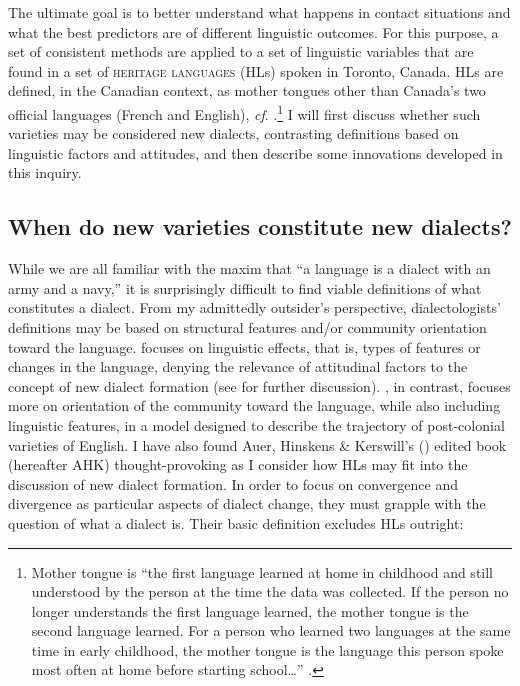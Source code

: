 \documentclass[output=paper]{LSP/langsci}
\begin{document}
The ultimate goal is to better understand what happens in contact situations and what the best predictors are of different linguistic outcomes. For this purpose, a set of consistent methods are applied to a set of linguistic variables that are found in a set of \textsc{heritage languages} (HLs) spoken in Toronto, Canada. HLs are defined, in the Canadian context, as mother tongues other than Canada’s two official languages (French and English), \textit{cf}. \citet{cummins_lifting_1990}.\footnote{Mother tongue is “the first language learned at home in childhood and still understood by the person at the time the data was collected. If the person no longer understands the first language learned, the mother tongue is the second language learned. For a person who learned two languages at the same time in early childhood, the mother tongue is the language this person spoke most often at home before starting school…” \citep{statistics_canada_mother_2014}.} I will first discuss whether such varieties may be considered new dialects, contrasting definitions based on linguistic factors and attitudes, and then describe some innovations developed in this inquiry.


\subsection{When do new varieties constitute new dialects?}
While we are all familiar with the maxim that “a language is a dialect with an army and a navy,” it is surprisingly difficult to find viable definitions of what constitutes a dialect. From my admittedly outsider’s perspective, dialectologists’ definitions may be based on structural features and/or community orientation toward the language. \citet{trudgill_dialects_1986,trudgill_new-dialect_2004} focuses on linguistic effects, that is, types of features or changes in the language, denying the relevance of attitudinal factors to the concept of new dialect formation (see \citealt[186]{meyerhoff_linguistic_2006} for further discussion). \citet{schneider_dynamics_2003, schneider_postcolonial_2007}, in contrast, focuses more on orientation of the community toward the language, while also including linguistic features, in a model designed to describe the trajectory of post-colonial varieties of English. I have also found Auer, Hinskens \& Kerswill’s (\citeyear{auer_dialect_2004}) edited book (hereafter AHK) thought-provoking as I consider how HLs may fit into the discussion of new dialect formation. In order to focus on convergence and divergence as particular aspects of dialect change, they must grapple with the question of what a dialect is. Their basic definition excludes HLs outright:
\end{document}
